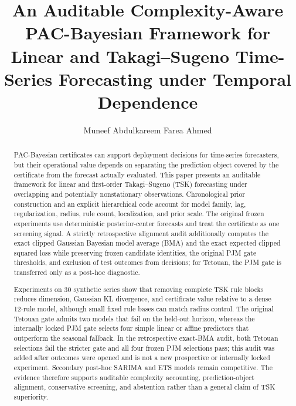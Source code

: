 \documentclass[preprint,12pt]{elsarticle}
\begin{document}
	
	
	\begin{frontmatter}
		
		
\title{
An Auditable Complexity-Aware PAC-Bayesian Framework for
Linear and Takagi--Sugeno Time-Series Forecasting under
Temporal Dependence
}
		
		
		\author[su]{Muneef Abdulkareem Farea Ahmed}
		
		
		
		
		
		
		
		
\begin{abstract}
PAC-Bayesian certificates can support deployment decisions for time-series
forecasters, but their operational value depends on separating the prediction
object covered by the certificate from the forecast actually evaluated. This
paper presents an auditable framework for linear and first-order
Takagi--Sugeno (TSK) forecasting under overlapping and potentially
nonstationary observations. Chronological prior construction and an explicit
hierarchical code account for model family, lag, regularization, radius, rule
count, localization, and prior scale. The original frozen experiments use
deterministic posterior-center forecasts and treat the certificate as one
screening signal. A strictly retrospective alignment audit additionally
computes the exact clipped Gaussian Bayesian model average (BMA) and the exact
expected clipped squared loss while preserving frozen candidate identities,
the original PJM gate thresholds, and exclusion of test outcomes from decisions; for Tetouan, the PJM gate is transferred only as a post-hoc diagnostic.

Experiments on 30 synthetic series show that removing complete TSK rule blocks
reduces dimension, Gaussian KL divergence, and certificate value relative to a
dense 12-rule model, although small fixed rule bases can match radius control.
The original Tetouan gate admits two models that fail on the held-out horizon,
whereas the internally locked PJM gate selects four simple linear or affine
predictors that outperform the seasonal fallback. In the retrospective
exact-BMA audit, both Tetouan selections fail the stricter gate and all four
frozen PJM selections pass; this audit was added after outcomes were opened and
is not a new prospective or internally locked experiment. Secondary post-hoc SARIMA and ETS models
remain competitive. The evidence therefore supports auditable complexity
accounting, prediction-object alignment, conservative screening, and
abstention rather than a general claim of TSK superiority.
\end{abstract}
		

\end{frontmatter}
\end{document}
